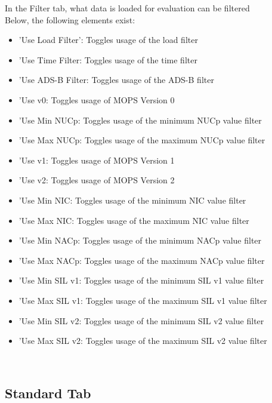 In the Filter tab, what data is loaded for evaluation can be filtered \\

Below, the following elements exist:
\begin{itemize}  
\item 'Use Load Filter': Toggles usage of the load filter
\item 'Use Time Filter: Toggles usage of the time filter
\item 'Use ADS-B Filter: Toggles usage of the ADS-B filter
\item 'Use v0: Toggles usage of MOPS Version 0
\item 'Use Min NUCp: Toggles usage of the minimum NUCp value filter
\item 'Use Max NUCp: Toggles usage of the maximum NUCp value filter
\item 'Use v1: Toggles usage of MOPS Version 1
\item 'Use v2: Toggles usage of MOPS Version 2
\item 'Use Min NIC: Toggles usage of the minimum NIC value filter
\item 'Use Max NIC: Toggles usage of the maximum NIC value filter
\item 'Use Min NACp: Toggles usage of the minimum NACp value filter
\item 'Use Max NACp: Toggles usage of the maximum NACp value filter
\item 'Use Min SIL v1: Toggles usage of the minimum SIL v1 value filter
\item 'Use Max SIL v1: Toggles usage of the maximum SIL v1 value filter
\item 'Use Min SIL v2: Toggles usage of the minimum SIL v2 value filter
\item 'Use Max SIL v2: Toggles usage of the maximum SIL v2 value filter
\end{itemize}
\ \\

\subsection{Standard Tab}

